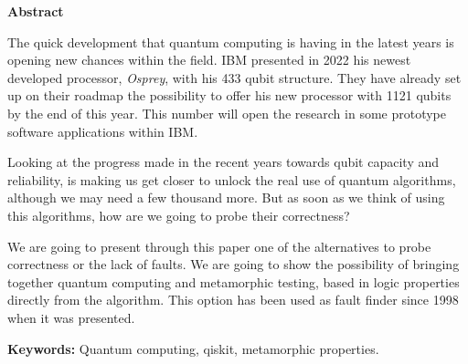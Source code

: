 \newpage

\thispagestyle{empty}

\begin{center}

{\bf \Huge Abstract}

  \end{center}
\vspace{1cm}

The quick development that quantum computing is having in the latest years is opening new chances within the field. IBM presented in 2022 his newest developed processor, \textit{Osprey}, with his 433 qubit structure. They have already set up on their roadmap the possibility to offer his new processor with 1121 qubits by the end of this year. This number will open the research in some prototype software applications within IBM.\newline

Looking at the progress made in the recent years towards qubit capacity and reliability, is making us get closer to unlock the real use of quantum algorithms, although we may need a few thousand more. But as soon as we think of using this algorithms, how are we going to probe their correctness?\newline

We are going to present through this paper one of the alternatives to probe correctness or the lack of faults. We are going to show the possibility of bringing together quantum computing and metamorphic testing, based in logic properties directly from the algorithm. This option has been used as fault finder since 1998 when it was presented.

\vspace{1cm}

\textbf{Keywords:} Quantum computing, qiskit, metamorphic properties.